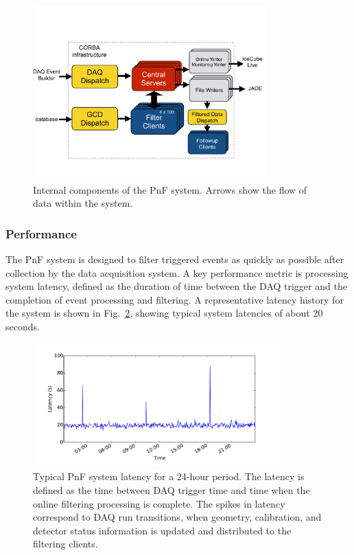 \begin{figure}[!ht]
 \centering
 \includegraphics[width=0.8\textwidth]{graphics/online/pnf/PnF_Internals.pdf}
 \caption{Internal components of the PnF
   system.  Arrows show the flow of data within the system.}
 \label{fig:online_pnf_internals}
\end{figure}

\subsubsection{Performance}

The PnF system is designed to filter triggered events as quickly as
possible after collection by the data acquisition 
system.  A key performance metric is processing system latency, defined as the duration
of time between the DAQ trigger and the completion of event
processing and filtering.  A representative latency history for the system is
shown in Fig.~\ref{fig:online_pnf_latency}, showing typical system
latencies of about 20 seconds.

\begin{figure}[!ht]
 \centering
 \includegraphics[width=0.85\textwidth]{graphics/online/pnf/pnf_latency_160627.pdf}
 \caption{Typical PnF system latency for a
   24-hour period.  The latency is defined as the time between DAQ trigger
   time and time when the online filtering processing is complete.  The
   spikes in latency correspond to DAQ run transitions, when
   geometry, calibration, and detector status information is updated and
   distributed to the filtering clients.}
 \label{fig:online_pnf_latency}
\end{figure}

